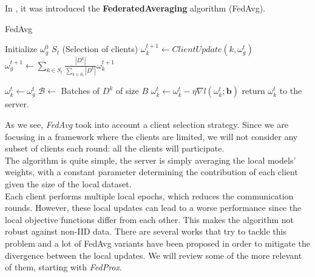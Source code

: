 In \cite*{mcmahan2023a}, it was introduced the \textbf{FederatedAveraging} algorithm (FedAvg).

\begin{algorithm}[H]
  \label{alg:FedAvg}
  \caption{FedAvg}
  \begin{algorithmic}[1]
    \Statex
    \State Initialize $\omega_g^0$
      \State $S_t$  (Selection of clients)
        \State $\omega_k^{t+1} \gets ClientUpdate(k, \omega_g^t)$
      \EndFor
      \State $\omega_g^{t+1} \gets \sum_{k \in S_t} \frac{|D^k|}{\sum_{k \in S_t} |D^k|} \omega_k^{t+1}$
    \EndFor
    \EndProcedure

    \State $\omega_k^t \gets \omega_g^t$
    \State $\mathcal{B} \gets$ Batches of $D^k$ of size $B$
        \State $\omega_k^t \gets \omega_k^t - \eta \nabla l(\omega_k^t; \mathbf{b})$
      \EndFor
    \EndFor
    \State return $\omega_k^t$ to the server.
    \EndProcedure
  \end{algorithmic}
\end{algorithm}

As we see, \textit{FedAvg} took into account a client selection strategy. Since we are focusing in a framework where the clients are limited, we will not consider any subset of clients each round: all the clients will participate.\\
The algorithm is quite simple, the server is simply averaging the local models' weights, with a constant parameter determining the contribution of each client given the size of the local dataset.\\
Each client performs multiple local epochs, which reduces the communication rounds. However, these local updates can lead to a worse performance since the local objective functions differ from each other. This makes the algorithm not robust against non-IID data. There are several works that try to tackle this problem and a lot of FedAvg variants have been proposed in order to mitigate the divergence between the local updates. We will review some of the more relevant of them, starting with \textit{FedProx}.

